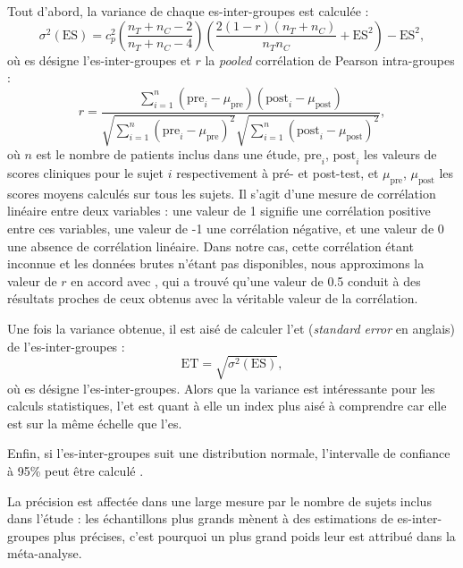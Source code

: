 Tout d'abord, la variance de chaque \gls{es}-inter-groupes est calculée \citep{Morris2008}:
\begin{equation}
\label{eq:metareview_variance_effect_size_between}
\sigma^2(\text{ES}) = c_p^2 \left (\frac{n_T + n_C - 2} {n_T + n_C - 4} \right ) \left  (\frac{2(1-r)(n_T + n_C)} {n_Tn_C} + \text{ES}^2 \right) - \text{ES}^2,
\end{equation}
où \gls{es} désigne l'\gls{es}-inter-groupes et $r$ la \textit{pooled} corrélation de Pearson intra-groupes \citep{James2013} :
\begin{equation}
\label{eq:metareview_within_group_pearson_correlation}
r = \frac{ \sum_{i=1}^{n} (\text{pre}_i - \mu_{\text{pre}})(\text{post}_i - \mu_{\text{post}}) } { \sqrt{ \sum_{i=1}^{n} (\text{pre}_i - 
\mu_{\text{pre}})^2} \sqrt{\sum_{i=1}^{n} (\text{post}_i - \mu_{\text{post}})^2} }, 
\end{equation}
où $n$ est le nombre de patients inclus dans une étude, $\text{pre}_i$, $\text{post}_i$ les valeurs de scores cliniques pour le sujet $i$ 
respectivement à pré- et post-test, et $\mu_{\text{pre}}$, $\mu_{\text{post}}$ les scores moyens calculés sur tous les sujets. 
Il s'agit d'une mesure de corrélation linéaire entre deux variables : une valeur de 1 signifie une corrélation positive entre ces variables,
une valeur de -1 une corrélation négative, et une valeur de 0 une absence de corrélation linéaire. 
Dans notre cas, cette corrélation étant inconnue et les données brutes n'étant pas disponibles, nous approximons la valeur de $r$ 
en accord avec \citet{Balk2012}, qui a trouvé qu'une valeur de 0.5 conduit à des résultats proches de ceux obtenus avec la véritable
valeur de la corrélation.

Une fois la variance obtenue, il est aisé de calculer l'\gls{et} (\textit{standard error} en anglais) de l'\gls{es}-inter-groupes 
\citep{Borenstein2009} :
\begin{equation}
\label{eq:metareview_standard_error_effect_size_between}
\text{ET} = \sqrt{\sigma^2(\text{ES})},
\end{equation}
où \gls{es} désigne l'\gls{es}-inter-groupes. Alors que la variance est intéressante pour les calculs statistiques, l'\gls{et} est quant à elle 
un index plus aisé à comprendre car elle est sur la même échelle que l'\gls{es}.

Enfin, si l'\gls{es}-inter-groupes suit une distribution normale, l'intervalle de confiance à 95\% peut être calculé \citep{Borenstein2009}.

La précision est affectée dans une large mesure par le nombre de sujets inclus dans l'étude : les échantillons plus grands mènent à des
estimations de \gls{es}-inter-groupes plus précises, c'est pourquoi un plus grand poids leur est attribué dans la méta-analyse.

